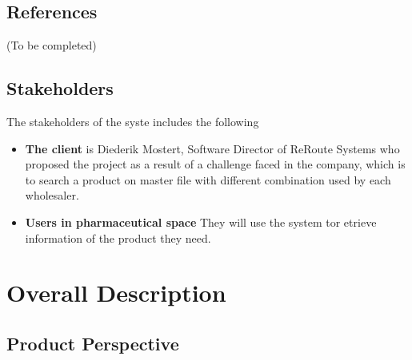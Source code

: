 \documentclass[a4paper,10pt]{article}
\begin{document}
	\subsection{References} 
	(To be completed)
	\subsection{Stakeholders}
	The stakeholders of the syste includes the following
	\begin{itemize}
	\item \textbf{The client} is Diederik Mostert, Software Director of ReRoute Systems who proposed the project as a result of a challenge faced in the company, which is to search a product on master file with different combination used by each wholesaler.
	\item \textbf{Users in pharmaceutical space} They will use the system tor etrieve information of the product they need.
	\end{itemize}

	\newpage

\section{Overall Description}

\subsection{Product Perspective}
\end{document}
